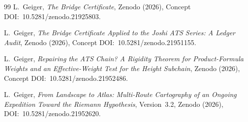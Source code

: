 \documentclass[12pt,a4paper]{article}
\theoremstyle{definition}
\theoremstyle{remark}
\begin{document}
\begin{thebibliography}{99}
L.~Geiger,
\emph{The Bridge Certificate},
Zenodo (2026), Concept DOI:~10.5281/zenodo.21925803.

L.~Geiger,
\emph{The Bridge Certificate Applied to the Joshi ATS Series:
A Ledger Audit},
Zenodo (2026), Concept DOI:~10.5281/zenodo.21951155.

L.~Geiger,
\emph{Repairing the ATS Chain?  A Rigidity Theorem for Product-Formula
Weights and an Effective-Weight Test for the Height Subchain},
Zenodo (2026), Concept DOI:~10.5281/zenodo.21952486.

L.~Geiger,
\emph{From Landscape to Atlas: Multi-Route Cartography of an Ongoing
Expedition Toward the Riemann Hypothesis},
Version~3.2, Zenodo (2026), DOI:~10.5281/zenodo.21952620.

\end{thebibliography}
\end{document}
